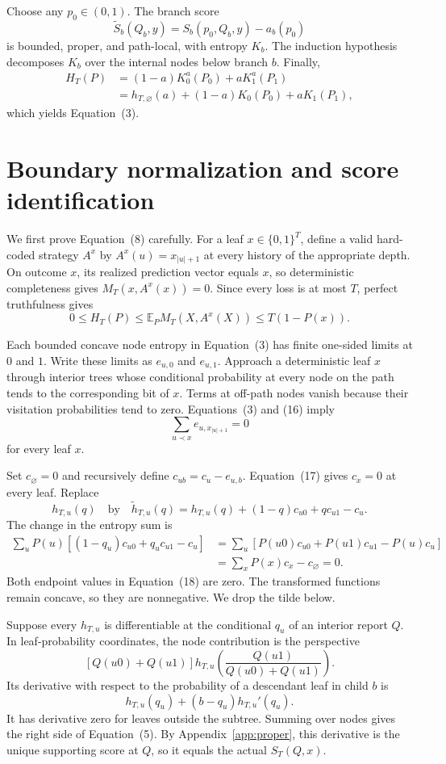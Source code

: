 \documentclass{article}
\theoremstyle{definition}
\theoremstyle{remark}
\newcommand{\E}{\mathbb E}
\newcommand{\1}{\mathbf 1}
\begin{document}
Choose any \(p_0\in(0,1)\). The branch score \[ \widetilde S_b(Q_b,y)=S_b(p_0,Q_b,y)-a_b(p_0) \] is bounded, proper, and path-local, with entropy \(K_b\). The induction hypothesis decomposes \(K_b\) over the internal nodes below branch \(b\). Finally,
\begin{align*}
H_T(P)
&=(1-a)K_0^a(P_0)+aK_1^a(P_1)\\
&=h_{T,\varnothing}(a)+(1-a)K_0(P_0)+aK_1(P_1),
\end{align*}
which yields Equation~(3).

\section{Boundary normalization and score identification}\label{app:normalization}

We first prove Equation~(8) carefully. For a leaf \(x\in\{0,1\}^T\), define a valid hard-coded strategy \(A^x\) by \(A^x(u)=x_{|u|+1}\) at every history of the appropriate depth. On outcome \(x\), its realized prediction vector equals \(x\), so deterministic completeness gives \(M_T(x,A^x(x))=0\). Since every loss is at most \(T\), perfect truthfulness gives \[ 0\le H_T(P)\le\E_PM_T(X,A^x(X))\le T(1-P(x)). \tag{16} \]

Each bounded concave node entropy in Equation~(3) has finite one-sided limits at \(0\) and \(1\). Write these limits as \(e_{u,0}\) and \(e_{u,1}\). Approach a deterministic leaf \(x\) through interior trees whose conditional probability at every node on the path tends to the corresponding bit of \(x\). Terms at off-path nodes vanish because their visitation probabilities tend to zero. Equations~(3) and (16) imply \[ \sum_{u\prec x}e_{u,x_{|u|+1}}=0 \tag{17} \] for every leaf \(x\).

Set \(c_\varnothing=0\) and recursively define \(c_{ub}=c_u-e_{u,b}\). Equation~(17) gives \(c_x=0\) at every leaf. Replace \[ h_{T,u}(q) \quad\text{by}\quad \widetilde h_{T,u}(q)=h_{T,u}(q)+(1-q)c_{u0}+qc_{u1}-c_u. \tag{18} \] The change in the entropy sum is
\begin{align*}
\sum_uP(u)[(1-q_u)c_{u0}+q_uc_{u1}-c_u]
&=\sum_u[P(u0)c_{u0}+P(u1)c_{u1}-P(u)c_u]\\
&=\sum_xP(x)c_x-c_\varnothing=0.
\end{align*}
Both endpoint values in Equation~(18) are zero. The transformed functions remain concave, so they are nonnegative. We drop the tilde below.

Suppose every \(h_{T,u}\) is differentiable at the conditional \(q_u\) of an interior report \(Q\). In leaf-probability coordinates, the node contribution is the perspective \[ [Q(u0)+Q(u1)]h_{T,u}\left(\frac{Q(u1)}{Q(u0)+Q(u1)}\right). \] Its derivative with respect to the probability of a descendant leaf in child \(b\) is \[ h_{T,u}(q_u)+(b-q_u)h_{T,u}'(q_u). \] It has derivative zero for leaves outside the subtree. Summing over nodes gives the right side of Equation~(5). By Appendix~\ref{app:proper}, this derivative is the unique supporting score at \(Q\), so it equals the actual \(S_T(Q,x)\).
\end{document}
